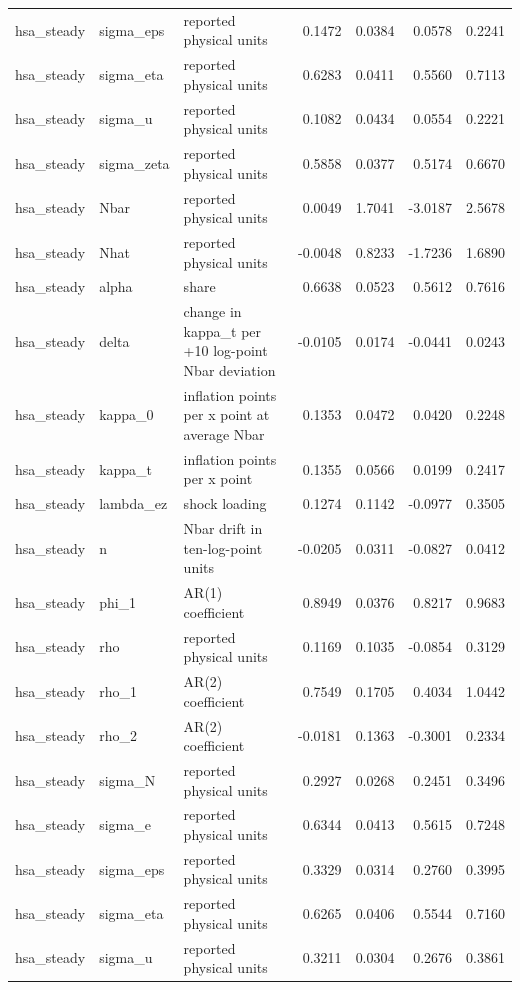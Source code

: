 \begin{tabular}{lllrrrr}
hsa\_steady & sigma\_eps & reported physical units & 0.1472 & 0.0384 & 0.0578 & 0.2241 \\
hsa\_steady & sigma\_eta & reported physical units & 0.6283 & 0.0411 & 0.5560 & 0.7113 \\
hsa\_steady & sigma\_u & reported physical units & 0.1082 & 0.0434 & 0.0554 & 0.2221 \\
hsa\_steady & sigma\_zeta & reported physical units & 0.5858 & 0.0377 & 0.5174 & 0.6670 \\
hsa\_steady & Nbar & reported physical units & 0.0049 & 1.7041 & -3.0187 & 2.5678 \\
hsa\_steady & Nhat & reported physical units & -0.0048 & 0.8233 & -1.7236 & 1.6890 \\
hsa\_steady & alpha & share & 0.6638 & 0.0523 & 0.5612 & 0.7616 \\
hsa\_steady & delta & change in kappa\_t per +10 log-point Nbar deviation & -0.0105 & 0.0174 & -0.0441 & 0.0243 \\
hsa\_steady & kappa\_0 & inflation points per x point at average Nbar & 0.1353 & 0.0472 & 0.0420 & 0.2248 \\
hsa\_steady & kappa\_t & inflation points per x point & 0.1355 & 0.0566 & 0.0199 & 0.2417 \\
hsa\_steady & lambda\_ez & shock loading & 0.1274 & 0.1142 & -0.0977 & 0.3505 \\
hsa\_steady & n & Nbar drift in ten-log-point units & -0.0205 & 0.0311 & -0.0827 & 0.0412 \\
hsa\_steady & phi\_1 & AR(1) coefficient & 0.8949 & 0.0376 & 0.8217 & 0.9683 \\
hsa\_steady & rho & reported physical units & 0.1169 & 0.1035 & -0.0854 & 0.3129 \\
hsa\_steady & rho\_1 & AR(2) coefficient & 0.7549 & 0.1705 & 0.4034 & 1.0442 \\
hsa\_steady & rho\_2 & AR(2) coefficient & -0.0181 & 0.1363 & -0.3001 & 0.2334 \\
hsa\_steady & sigma\_N & reported physical units & 0.2927 & 0.0268 & 0.2451 & 0.3496 \\
hsa\_steady & sigma\_e & reported physical units & 0.6344 & 0.0413 & 0.5615 & 0.7248 \\
hsa\_steady & sigma\_eps & reported physical units & 0.3329 & 0.0314 & 0.2760 & 0.3995 \\
hsa\_steady & sigma\_eta & reported physical units & 0.6265 & 0.0406 & 0.5544 & 0.7160 \\
hsa\_steady & sigma\_u & reported physical units & 0.3211 & 0.0304 & 0.2676 & 0.3861 \\

\end{tabular}
